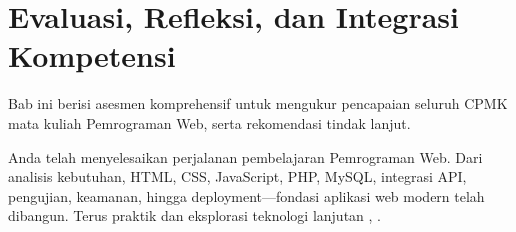 \documentclass[../main]{subfiles}
\begin{document}
\chapter{Evaluasi, Refleksi, dan Integrasi Kompetensi}

Bab ini berisi asesmen komprehensif untuk mengukur pencapaian seluruh CPMK mata kuliah Pemrograman Web, serta rekomendasi tindak lanjut.






\begin{rangkuman}
Anda telah menyelesaikan perjalanan pembelajaran Pemrograman Web. Dari analisis kebutuhan, HTML, CSS, JavaScript, PHP, MySQL, integrasi API, pengujian, keamanan, hingga deployment---fondasi aplikasi web modern telah dibangun. Terus praktik dan eksplorasi teknologi lanjutan \cite{mdn-learn}, \cite{webdev}.
\end{rangkuman}

\ifSubfilesClassLoaded{
  \renewcommand{\bibname}{Daftar Pustaka}
  
  
}{}
\end{document}
